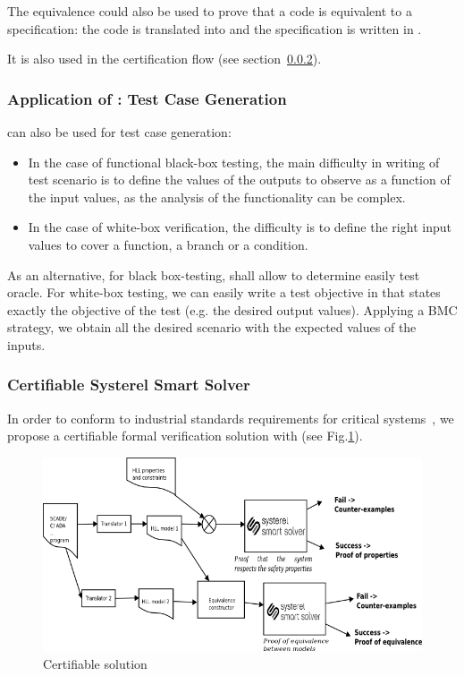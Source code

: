 The equivalence could also be used to prove that a code is equivalent to
a specification: the code is translated into \HLL{} and the
specification is written in \HLL{}.

It is also used in the certification flow (see section~\ref{cs3}).


\subsubsection{Application of \smartsolver{}: Test Case Generation}
\label{sec:test-case}

\smartsolver{} can also be used for test case generation:
\begin{itemize}
\item In the case of functional black-box testing, the main difficulty in writing of test scenario is to  define the values of the outputs to observe as a function of the input values, as the analysis of the functionality can be complex.
\item In the case of white-box verification, the difficulty is to define the right input values to cover a function, a branch or a condition.
\end{itemize} 



As an alternative, for black box-testing, \smartsolver{} shall allow to determine easily test oracle.
For white-box testing, we can easily write a test objective in \HLL{} that
states exactly the objective of the test (e.g. the desired output values). Applying a BMC strategy, we obtain all the desired scenario with the expected values of the inputs.


\subsubsection{Certifiable Systerel Smart Solver}
\label{cs3}

In order to conform to industrial standards  requirements for critical systems~\cite{standard_railway_2011,standard_aerospace_2011}, we propose a certifiable formal verification solution with  \smartsolver{} (see Fig.\ref{fig:s3-certif-check}).


\begin{figure}[h]
  \centering
  \includegraphics[width=1\textwidth]{figures/s3certif}
  \caption{Certifiable solution}
  \label{fig:s3-certif-check}
\end{figure}

